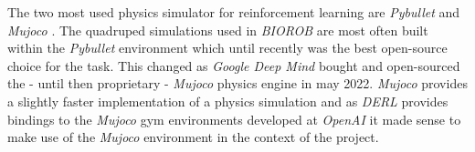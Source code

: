 The two most used physics simulator for reinforcement learning are \textit{Pybullet} \cite{pybullet} and \textit{Mujoco} \cite{mujoco}. The quadruped simulations used in \textit{BIOROB} are most often built within the \textit{Pybullet} environment which until recently was the best open-source choice for the task. This changed as \textit{Google Deep Mind} bought and open-sourced the - until then proprietary - \textit{Mujoco} physics engine in may 2022. \textit{Mujoco} provides a slightly faster implementation of a physics simulation and as \textit{DERL} provides bindings to the \textit{Mujoco} gym environments developed at \textit{OpenAI} it made sense to make use of the \textit{Mujoco} environment in the context of the project.

